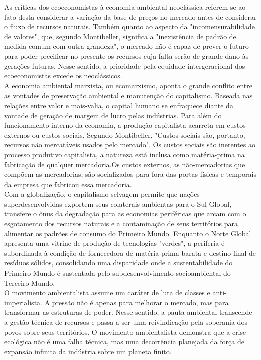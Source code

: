 \documentclass[12pt, a4paper]{article}
\begin{document}
	As críticas dos ecoeconomistas à economia ambiental neoclássica referem-se ao fato desta considerar a variação da base de preços no mercado antes de considerar o fluxo de recursos naturais. Também quanto ao aspecto da "incomensurabilidade de valores", que, segundo Montibeller, significa a "inexistência de padrão de medida comum com outra grandeza", o mercado não é capaz de prever o futuro para poder precificar no presente os recursos cuja falta serão de grande dano às gerações futuras. Nesse sentido, a prioridade pela equidade intergeracional dos ecoeconomistas excede os neoclássicos.
	\\

	A economia ambiental marxista, ou ecomarxismo, aponta o grande conflito entre as vontades de preservação ambiental e manutenção do capitalismo. Baseada nas relações entre valor e mais-valia, o capital humano se enfraquece diante da vontade de geração de margem de lucro pelas indústrias. Para além do funcionamento interno da economia, a produção capitalista acarreta em custos externos ou custos sociais. Segundo Montibeller, "Custos sociais são, portanto, recursos não mercatáveis usados pelo mercado". Os custos sociais são inerentes ao processo produtivo capitalista, a natureza está inclusa como matéria-prima na fabricação de qualquer mercadoria.Os custos externos, as não-mercadorias que compõem as mercadorias, são socializados para fora das portas físicas e temporais da empresa que fabricou essa mercadoria.
	\\

	Com a globalização, o capitalismo selvagem permite que nações superdesenvolvidas exportem seus colaterais ambientas para o Sul Global, transfere o ônus da degradação para as economias periféricas que arcam com o esgotamento dos recursos naturais e a contaminação  de seus territórios para alimentar os padrões de consumo do Primeiro Mundo. Enquanto o Norte Global apresenta uma vitrine de produção de tecnologias "verdes", a periferia é subordinada à condição de fornecedora de matéria-prima barata e destino final de resíduos sólidos, consolidando uma disparidade onde a sustentabilidade do Primeiro Mundo é sustentada pelo subdesenvolvimento socioambiental do Terceiro Mundo.
	\\

	O movimento ambientalista assume um caráter de luta de classes e anti-imperialista. A pressão não é apenas para melhorar o mercado, mas para transformar as estruturas de poder. Nesse sentido, a pauta ambiental transcende a gestão técnica de recursos e passa a ser uma reivindicação pela soberania dos povos sobre seus territórios. O movimento ambientalista demonstra que a  crise ecológica não é uma falha técnica, mas uma decorrência planejada da força de expansão infinita da indústria sobre um planeta finito.
\end{document}

